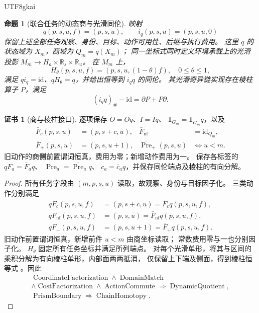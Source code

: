 \documentclass[12pt,a4paper,openany,notitlepage]{report}
\theoremstyle{plain}
\newtheorem{proposition}[theorem]{命题}
\theoremstyle{definition}
\newtheorem*{certificate}{证书}
\theoremstyle{remark}
\begin{document}
\begin{CJK*}{UTF8}{gkai}
\begin{proposition}[联合任务的动态商与光滑同伦]
\label{hgov:prop:jointquotient}
映射
\[
q(p,s,u,f)=(p,s,u),\qquad i_q(p,s,u)=(p,s,u,0)
\]
保留上述全部任务观察、身份、目标、动作可用性、后继与执行费用。
这里 $q$ 的状态域为 $X_m$，商域为 $Q_m=q(X_m)$；
同一坐标式同时定义环境承载上的光滑投影
$M_m\to H_a\times\mathbb R_s\times\mathbb R_u$。
在 $M_m$ 上，
\[
H_\theta(p,s,u,f)=(p,s,u,(1-\theta)f),\quad 0\le\theta\le1,
\]
满足 $qi_q=\mathrm{id}$、$qH_\theta=q$，并给出恒等到 $i_qq$ 的同伦。
其光滑奇异链实现存在棱柱算子 $P$，满足
\[
(i_qq)_\#-\mathrm{id}=\partial P+P\partial.
\]
\end{proposition}
\begin{certificate}[商与棱柱接口]
逐项保存 $O=\bar Oq$、$I=\bar Iq$、
$\mathbf1_{G_m}=\mathbf1_{\bar G_m}q$，以及
\[
 \begin{aligned}
 \bar F_c(p,s,u)&=(p,s+c,u),&
 \bar F_{\mathrm{nf}}&=\mathrm{id}_{Q_m},\\
 \bar F_+(p,s,u)&=(p,s,u+1),&
 \overline{\operatorname{Pre}}_+(p,s,u)&\iff u<m.
 \end{aligned}
\]
旧动作的商侧前置谓词恒真，费用为零；新增动作费用为一。
保存各标签的 $qF_a=\bar F_aq$、
$\operatorname{Pre}_a=\overline{\operatorname{Pre}}_a q$、
$c_a=\bar c_aq$，并保存同伦端点及棱柱的有向分解。
\end{certificate}
\begin{proof}
所有任务字段由 $(m,p,s,u)$ 读取，故观察、身份与目标因子化。
三类动作分别满足
\[
 \begin{aligned}
 qF_c(p,s,u,f)&=(p,s+c,u)=\bar F_cq(p,s,u,f),\\
 qF_{\mathrm{nf}}(p,s,u,f)&=(p,s,u)=\bar F_{\mathrm{nf}}q(p,s,u,f),\\
 qF_+(p,s,u,f)&=(p,s,u+1)=\bar F_+q(p,s,u,f).
 \end{aligned}
\]
旧动作前置谓词恒真，新增前件 $u<m$ 由商坐标读取；
常数费用零与一也分别因子化。
$H_\theta$ 固定所有任务坐标并满足所列端点。
对每个光滑单形，将其与区间的乘积分解为有向棱柱单形，内部面两两抵消，
仅保留上下端及侧面，得到棱柱恒等式 \cite{ExtHatcher,S38}。因此
\[
\begin{gathered}
\operatorname{CoordinateFactorization}
\land\operatorname{DomainMatch}\\
\land\operatorname{CostFactorization}
\land\operatorname{ActionCommute}
\Rightarrow\operatorname{DynamicQuotient},\\
\operatorname{PrismBoundary}\Rightarrow\operatorname{ChainHomotopy}.
\end{gathered}
\]
\end{proof}


\end{CJK*}
\end{document}
